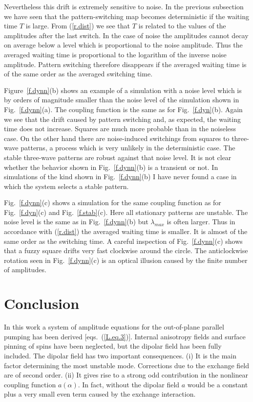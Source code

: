 Nevertheless this drift is extremely sensitive to noise. In the
previous subsection we have seen that the pattern-switching map
becomes deterministic if the waiting time $T$ is large. From
(\ref{r.dist}) we see that $T$ is related to the values of the
amplitudes after the last switch. In the case of noise the amplitudes
cannot decay on average below a level which is proportional to the
noise amplitude.  Thus the averaged waiting time is proportional to
the logarithm of the inverse noise amplitude. Pattern switching
therefore disappears if the averaged waiting time is of the same
order as the averaged switching time.

Figure~\ref{f.dynn}(b) shows an example of a simulation with a noise
level which is by orders of magnitude smaller than the noise level of
the simulation shown in Fig.~\ref{f.dynn}(a). The coupling function
is the same as for Fig.~\ref{f.dyn}(b). Again we see that the drift 
caused by pattern switching and, as expected, the waiting time does
not increase.  Squares are much more probable than in the noiseless
case.  On the other hand there are noise-induced switchings from
squares to three-wave patterns, a process which is very unlikely in
the deterministic case.  The stable three-wave patterns are robust
against that noise level.  It is not clear whether the behavior shown
in Fig.~\ref{f.dynn}(b) is a transient or not. In simulations of the
kind shown in Fig.~\ref{f.dynn}(b) I have never found a case in which
the system selects a stable pattern. 

Fig.~\ref{f.dynn}(c) shows a simulation for the same coupling
function as for Fig.~\ref{f.dyn}(c) and Fig.~\ref{f.stab}(c). Here
all stationary patterns are unstable. The noise level is the same as
in Fig.~\ref{f.dynn}(b) but $\lambda_{max}$ is often larger. Thus in
accordance with (\ref{r.dist}) the averaged waiting time is smaller.
It is almost of the same order as the switching time. A careful
inspection of Fig.~\ref{f.dynn}(c) shows that a fuzzy square drifts
very fast clockwise around the circle. The anticlockwise rotation seen
in Fig.~\ref{f.dynn}(c) is an optical illusion caused by the finite
number of amplitudes.


\section{\protect\label{CON}Conclusion}

In this work a system of amplitude equations for the out-of-plane
parallel pumping has been derived [eqs.~(\ref{L.eq.3})]. Internal
anisotropy fields and surface pinning of spins have been neglected,
but the dipolar field has been fully included. The dipolar field has
two important consequences. (i) It is the main factor determining the
most unstable mode. Corrections due to the exchange field are of
second order. (ii) It gives rise to a strong odd contribution in the
nonlinear coupling function $a(\alpha)$. In fact, without the dipolar
field $a$ would be a constant plus a very small even term caused by
the exchange interaction. 

